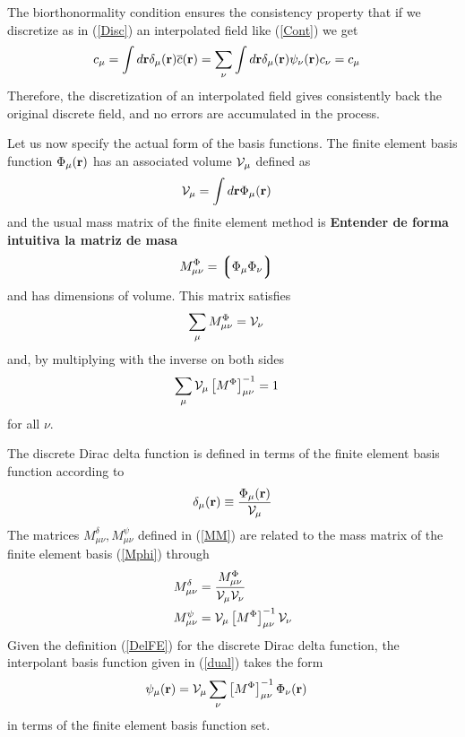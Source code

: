 \documentclass[b5paper,openright,11pt]{book}
\newcommand{\Note}[1]{{\bf \color{red}#1}}    %
\newcommand{\llg}{\left\lgroup}
\newcommand{\rlg}{\right\rgroup}
\begin{document}
The biorthonormality  condition ensures the consistency  property that
if  we  discretize  as  in (\ref{Disc})  an  interpolated  field  like
(\ref{Cont}) we get
\begin{align}
  c_\mu&=\int d{\bf r}\delta_\mu({\bf r})\overline{c}({\bf r})
=\sum_\nu\int d{\bf r}\delta_\mu({\bf r})\psi_\nu({\bf r})c_\nu=c_\mu
\end{align}
Therefore,  the   discretization  of   an  interpolated   field  gives
consistently back the original discrete field, and no errors are accumulated in the process.

Let us now specify the actual form of the basis functions.  The finite
element basis  function $\Phi_\mu({\bf  r})$ has an  associated volume
${\cal V}_\mu$ defined as
\begin{align}
  {\cal V}_{\mu}&=\int d{\bf r}\Phi_\mu({\bf r})
\end{align}
and the usual mass matrix of the finite element method is \Note{Entender de forma intuitiva la matriz de masa}
\begin{align}
M^\Phi_{\mu\nu}&=\llg\Phi_\mu\Phi_\nu\rlg  
\label{Mphi}
\end{align}
 and has dimensions of volume. This matrix satisfies 
\begin{align}
\sum_\mu M^\Phi_{\mu\nu} &={\cal V}_\nu
\end{align}
and, by multiplying with the inverse on both sides
\begin{align}
  \sum_\mu {\cal V}_\mu \left[M^{\Phi}\right]^{-1}_{\mu\nu}&=1
\label{sumM}
\end{align}
for all $\nu$.

The discrete  Dirac delta function is  defined in terms of  the finite
element basis function according to
\begin{align}
  \delta_\mu({\bf r})\equiv\frac{\Phi_\mu({\bf r})}{{\cal V}_\mu}
\label{DelFE}
\end{align}
The matrices $M^\delta_{\mu\nu}, M^\psi_{\mu\nu}$ defined in (\ref{MM}) are related to
the mass matrix of the finite element basis (\ref{Mphi}) through
\begin{align}
  M^\delta_{\mu\nu}&=\frac{  M^\Phi_{\mu\nu}}{{\cal V}_\mu{\cal V}_\nu}
\nonumber\\
M^\psi_{\mu\nu}&={\cal V}_\mu \left[M^{\Phi}\right]^{-1}_{\mu\nu}{\cal V}_\nu
\label{MdMp}
\end{align}
Given the definition (\ref{DelFE}) for the discrete Dirac delta function,  the interpolant basis function given in (\ref{dual}) takes the form
\begin{align}
  \psi_\mu({\bf r})&
  ={\cal V}_\mu \sum_\nu \left[M^{\Phi}\right]^{-1}_{\mu\nu} \Phi_\nu({\bf r})
\label{PsiFE}
\end{align}
in terms of the finite element basis function set.
\end{document}
